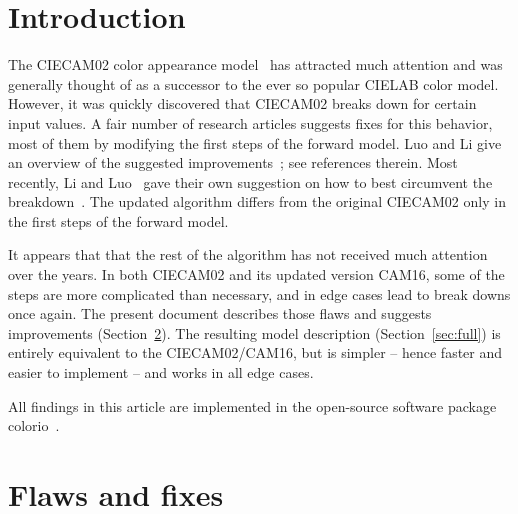 \documentclass[twocolumn]{scrartcl}
\title{\mytitle}
\author{\myauthor}
\theoremstyle{named}
\begin{document}
\maketitle
\begin{abstract}
  This note is concerned with the CIECAM02 color appearance model and its
  successor, the CAM16 color appearance model. Several algorithmic flaws are
  pointed out and remedies are suggested. The resulting color model is
  algebraically equivalent to CIECAM02/CAM16, but shorter, more efficient, and
  works correctly for all edge cases.
\end{abstract}

\section{Introduction}

The CIECAM02 color appearance model~\cite{ciecam02} has attracted much
attention and was generally thought of as a successor to the ever so popular
CIELAB color model. However, it was quickly discovered that CIECAM02 breaks
down for certain input values. A fair number of research articles suggests
fixes for this behavior, most of them by modifying the first steps of the
forward model. Luo and Li give an overview of the suggested
improvements~\cite{ciecam02-recent}; see references therein.  Most recently,
Li and Luo~\cite{cam16} gave their own suggestion on how to best
circumvent the breakdown~\cite{cam16}. The updated algorithm differs from the
original CIECAM02 only in the first steps of the forward model.

It appears that that the rest of the algorithm has not received much attention
over the years. In both CIECAM02 and its updated version CAM16, some of the
steps are more complicated than necessary, and in edge cases lead to break
downs once again. The present document describes those flaws and suggests
improvements (Section~\ref{sec:ff}). The resulting model description
(Section~\ref{sec:full}) is entirely equivalent to the CIECAM02/CAM16, but is
simpler -- hence faster and easier to implement -- and works in all edge
cases.

All findings in this article are implemented in the open-source software package
colorio~\cite{colorio}.


\section{Flaws and fixes}\label{sec:ff}
\end{document}
